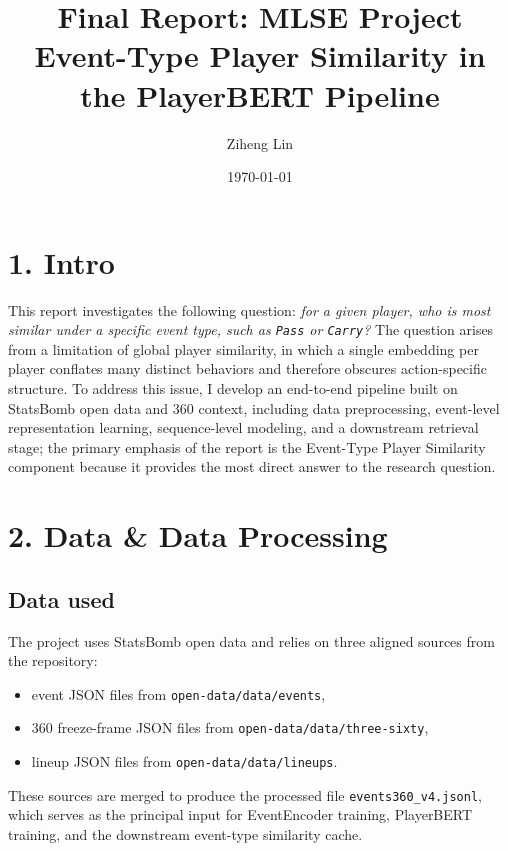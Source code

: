 \documentclass[11pt]{article}
\title{Final Report: MLSE Project\\Event-Type Player Similarity in the PlayerBERT Pipeline}
\author{Ziheng Lin}
\date{\today}
\begin{document}
\maketitle

\section{1. Intro}

This report investigates the following question: \emph{for a given player, who is most similar under a specific event type, such as \texttt{Pass} or \texttt{Carry}?} The question arises from a limitation of global player similarity, in which a single embedding per player conflates many distinct behaviors and therefore obscures action-specific structure. To address this issue, I develop an end-to-end pipeline built on StatsBomb open data and 360 context, including data preprocessing, event-level representation learning, sequence-level modeling, and a downstream retrieval stage; the primary emphasis of the report is the Event-Type Player Similarity component because it provides the most direct answer to the research question.

\section{2. Data \& Data Processing}

\subsection{Data used}

The project uses StatsBomb open data and relies on three aligned sources from the repository:
\begin{itemize}[leftmargin=*]
  \item event JSON files from \texttt{open-data/data/events},
  \item 360 freeze-frame JSON files from \texttt{open-data/data/three-sixty},
  \item lineup JSON files from \texttt{open-data/data/lineups}.
\end{itemize}

These sources are merged to produce the processed file \texttt{events360\_v4.jsonl}, which serves as the principal input for EventEncoder training, PlayerBERT training, and the downstream event-type similarity cache.
\end{document}
